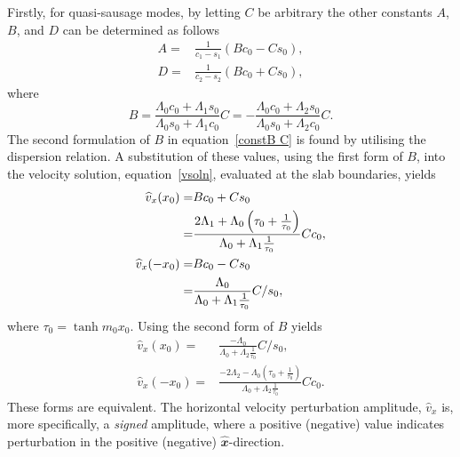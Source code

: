 \documentclass[namedreferences]{solarphysics}
\numberwithin{equation}{section}
\begin{document}
\begin{article}
Firstly, for quasi-sausage modes, by letting $C$ be arbitrary the other constants $A$, $B$, and $D$ can be determined as follows
\begin{align}
A=&\frac{1}{c_1-s_1}(Bc_0-Cs_0), \label{constA C} \\ 
D=&\frac{1}{c_2-s_2}(Bc_0+Cs_0), \label{constD C}
\end{align}
where
\begin{equation}
B=\frac{\Lambda_0c_0+\Lambda_1s_0}{\Lambda_0s_0+\Lambda_1c_0}C=-\frac{\Lambda_0c_0+\Lambda_2s_0}{\Lambda_0s_0+\Lambda_2c_0}C. \label{constB C}
\end{equation}
The second formulation of $B$ in equation~\eqref{constB C} is found by utilising the dispersion relation. A substitution of these values, using the first form of $B$, into the velocity solution, equation~\eqref{vsoln}, evaluated at the slab boundaries, yields
\begin{align}
\widehat{v}_x(x_0)=&Bc_0+Cs_0 \notag \\
			  =&\frac{2\Lambda_1+\Lambda_0\left(\tau_0+\frac{1}{\tau_0}\right)}{\Lambda_0+\Lambda_1\frac{1}{\tau_0}}Cc_0, \label{vx_01 C} \\
\widehat{v}_x(-x_0)=&Bc_0-Cs_0 \notag \\
			  =&\frac{\Lambda_0}{\Lambda_0+\Lambda_1\frac{1}{\tau_0}}C/s_0, \label{v-x_01 C}
\end{align}
where $\tau_0=\tanh{m_0x_0}$.
Using the second form of $B$ yields
\begin{align}
\widehat{v}_x(x_0)=&\frac{-\Lambda_0}{\Lambda_0+\Lambda_2\frac{1}{\tau_0}}C/s_0, \label{vx_02 C} \\
\widehat{v}_x(-x_0)=&\frac{-2\Lambda_2-\Lambda_0\left(\tau_0+\frac{1}{\tau_0}\right)}{\Lambda_0+\Lambda_2\frac{1}{\tau_0}}Cc_0. \label{v-x_02 C}
\end{align}
These forms are equivalent. The horizontal velocity perturbation amplitude, $\widehat{v}_x$ is, more specifically, a \emph{signed} amplitude, where a positive (negative) value indicates perturbation in the positive (negative) $\mathbfit{\widehat{x}}$-direction.


\end{article}
\end{document}
